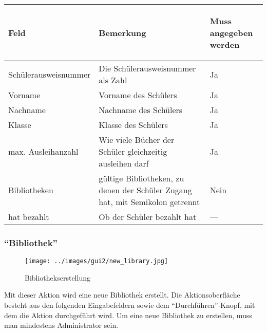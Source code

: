 \begin{tabular}{|p{}|p{}|p{}|}\hline
\begin{center}Feld\end{center} & \begin{center}Bemerkung\end{center} & \begin{center}Muss angegeben werden\end{center}\\
\hline
Schüler\-ausweis\-nummer & Die Schülerausweisnummer als Zahl & Ja\\
\hline
Vorname & Vorname des Schülers & Ja\\
\hline
Nachname & Nachname des Schülers & Ja\\
\hline
Klasse & Klasse des Schülers & Ja\\
\hline
max. \mbox{Ausleihanzahl} & Wie viele Bücher der Schüler gleichzeitig ausleihen darf & Ja\\
\hline
Bibliotheken & gültige Bibliotheken, zu denen der Schüler Zugang hat, mit Semikolon getrennt & Nein\\
\hline
hat bezahlt & Ob der Schüler bezahlt hat &   ---\\
\hline
\end{tabular}

\subsubsection{``Bibliothek''}
\label{subsubsec:detail:new:library}
\begin{figure}\texttt{[image: ../images/gui2/new\_library.jpg]}\caption{Bibliothekserstellung}\label{fig:new_library}\end{figure}

Mit dieser Aktion wird eine neue Bibliothek erstellt. Die Aktionsoberfläche besteht aus den folgenden Eingabefeldern sowie dem ``Durchführen''-Knopf, mit dem die Aktion durchgeführt wird.
Um eine neue Bibliothek zu erstellen, muss man mindestens Administrator sein.

